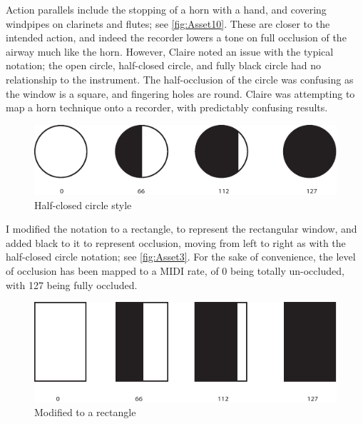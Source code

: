 Action parallels include the stopping of a horn with a hand, and covering windpipes on clarinets and flutes; see \autoref{fig:Asset10}. 
These are closer to the intended action, and indeed the recorder lowers a tone on full occlusion of the airway much like the horn. 
However, Claire noted an issue with the typical notation; the open circle, half-closed circle, and fully black circle had no relationship to the instrument. 
The half-occlusion of the circle was confusing as the window is a square, and fingering holes are round.
Claire was attempting to map a horn technique onto a recorder, with predictably confusing results. 

\begin{figure}
\includegraphics[width=\linewidth]{./resources/Asset 10.pdf}
\caption{Half-closed circle style}\label{fig:Asset10}
\end{figure}


I modified the notation to a rectangle, to represent the rectangular window, and added black to it to represent occlusion, moving from left to right as with the half-closed circle notation; see \autoref{fig:Asset3}.
For the sake of convenience, the level of occlusion has been mapped to a MIDI rate, of 0 being totally un-occluded, with 127 being fully occluded.

\begin{figure}
\includegraphics[width=\linewidth]{./resources/Asset 3.pdf}
\caption{Modified to a rectangle}\label{fig:Asset3}
\end{figure}

